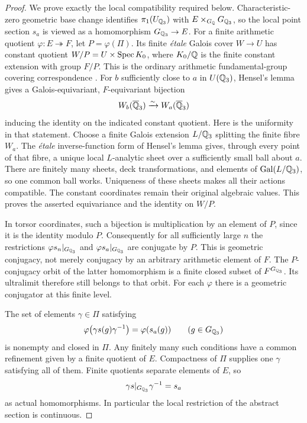 \begin{proof}
We prove exactly the local compatibility required below.
Characteristic-zero geometric base change identifies
$\pi_1(U_{\mathbb Q_3})$ with $E\times_{G_\mathbb Q}G_{\mathbb Q_3}$,
so the local point section $s_a$ is viewed as a homomorphism
$G_{\mathbb Q_3}\to E$.
For a finite arithmetic quotient $\varphi:E\twoheadrightarrow F$,
let $P=\varphi(\Pi)$. Its finite \emph{\'etale} Galois
cover $W\to U$ has constant quotient
$W/P=U\times\operatorname{Spec} K_0$, where $K_0/\mathbb Q$ is the finite
constant extension with group $F/P$. This is the ordinary
arithmetic fundamental-group covering correspondence
\citep[Expos\'e~IX, \S6]{E_SGA1}.
For $b$ sufficiently close to $a$ in $U(\mathbb Q_3)$, Hensel's
lemma gives a Galois-equivariant, $F$-equivariant bijection
\[
                         W_b(\overline{\mathbb Q}_3)
                              \xrightarrow{\sim}
                         W_a(\overline{\mathbb Q}_3)
\]
inducing the identity on the indicated constant quotient.
Here is the uniformity in that statement. Choose a finite
Galois extension $L/\mathbb Q_3$ splitting the finite fibre $W_a$.
The \emph{\'etale} inverse-function form of Hensel's lemma
gives, through every point of that fibre, a unique local
$L$-analytic sheet over a sufficiently small ball about $a$.
There are finitely many sheets, deck transformations, and
elements of $\operatorname{Gal}(L/\mathbb Q_3)$, so one common ball works.
Uniqueness of these sheets makes all their actions compatible.
The constant coordinates remain their original algebraic
values. This proves the asserted equivariance and the identity
on $W/P$.

In torsor coordinates, such a bijection is multiplication by
an element of $P$, since it is the identity modulo $P$.
Consequently for all sufficiently large $n$ the restrictions
$\varphi s_n|_{G_{\mathbb Q_3}}$ and
$\varphi s_a|_{G_{\mathbb Q_3}}$ are conjugate by $P$.
This is geometric conjugacy, not merely conjugacy by an
arbitrary arithmetic element of $F$. The $P$-conjugacy orbit
of the latter homomorphism is a finite closed subset of
$F^{G_{\mathbb Q_3}}$. Its ultralimit therefore still belongs to
that orbit. For each $\varphi$ there is a geometric
conjugator at this finite level.

The set of elements $\gamma\in\Pi$ satisfying
\[
 \varphi\big(\gamma s(g)\gamma^{-1}\big)=\varphi(s_a(g))
                    \qquad(g\in G_{\mathbb Q_3})
\]
is nonempty and closed in $\Pi$. Any finitely many such
conditions have a common refinement given by a finite
quotient of $E$. Compactness of $\Pi$ supplies one
$\gamma$ satisfying all of them. Finite quotients separate
elements of $E$, so
\[
               \gamma s|_{G_{\mathbb Q_3}}\gamma^{-1}=s_a
\]
as actual homomorphisms. In particular the local restriction
of the abstract section is continuous.


\end{proof}
